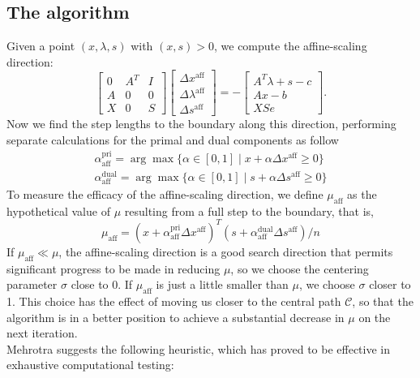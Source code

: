 \documentclass[a4paper,10 pt,titlepage,twoside]{book}
\theoremstyle{plain}
\theoremstyle{definition}
\theoremstyle{remark}
\begin{document}
\subsection*{The algorithm}
Given a point $(x, \lambda, s)$ with $(x, s)> 0$, we compute the affine-scaling direction:
\begin{equation}\label{(A)}
\begin{bmatrix}
0&A^{T}&I \\A&0&0\\X&0&S
\end{bmatrix}\begin{bmatrix}
\Delta x^{\text{aff}}\\\Delta\lambda^{\text{aff}}\\\Delta s^{\text{aff}}
\end{bmatrix}=-\begin{bmatrix}
A^{T}\lambda+s-c\\Ax-b\\XSe
\end{bmatrix}.
\end{equation}
Now we find the step lengths to the boundary along this direction, performing separate calculations for the primal and dual components as follow
\begin{align}\label{Qw}
\alpha_{\text{aff}}^{\text{pri}}=\arg\max\{\alpha\in[0,1]\;|\;x +\alpha\Delta x^{\text{aff}}\geq 0\} \\
\alpha_{\text{aff}}^{\text{dual}}=\arg\max\{\alpha\in[0,1]\;|\;s +\alpha\Delta s^{\text{aff}}\geq 0\}
\end{align}
To measure the efficacy of the affine-scaling direction, we define $\mu_{\text{aff}}$ as the hypothetical value of $\mu$ resulting from a full step to the boundary, that is,
\begin{equation*}
	\mu_{\text{aff}}= (x+\alpha_{\text{aff}}^{\text{pri}}\Delta x^{\text{aff}})^{T}(s+\alpha_{\text{aff}}^{\text{dual}}\Delta s^{\text{aff}})/n
\end{equation*}
If $\mu_{\text{aff}}\ll\mu$, the affine-scaling direction is a good search direction that permits significant progress to be made in reducing $\mu$, so we choose the centering parameter $\sigma$ close to 0. If $\mu_{\text{aff}}$ is just a little smaller than $\mu$, we choose $\sigma$ closer to 1. This choice has the effect of moving us closer  to the central path $\mathcal{C}$, so that the algorithm is in a better position to achieve a substantial decrease in $\mu$ on the next iteration.\\
Mehrotra \cite{MER} suggests the following heuristic, which has proved to be effective in exhaustive computational testing:
\end{document}
